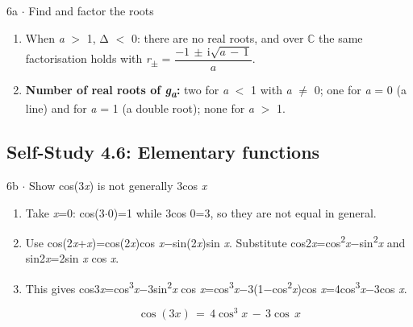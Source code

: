 \documentclass[11pt]{article}
\begin{document}
\begin{keepsection}
\begin{workedbox}{6a \ensuremath{\cdot} Find and factor the roots}
\begin{enumerate}
At \textit{a} = 1, Δ = 0 and \textit{g}\textsubscript{\textit{a}} = (\textit{x} + 1)\textsuperscript{2}, a double root at \ensuremath{-}1.
\item When \textit{a} \ensuremath{>} 1, Δ \ensuremath{<} 0: there are no real roots, and over \ensuremath{\mathbb{C}} the same factorisation holds with \textit{r}\textsubscript{\ensuremath{\pm}} = {\small\ensuremath{\dfrac{-1\, \pm \, \mathrm{i}\sqrt{{a}\, -\, 1}}{{a}}}}.
\item \textbf{Number of real roots of \textit{g}\textsubscript{\textit{a}}:} two for \textit{a} \ensuremath{<} 1 with \textit{a} \ensuremath{\neq} 0; one for \textit{a} = 0 (a line) and for \textit{a} = 1 (a double root); none for \textit{a} \ensuremath{>} 1.
\end{enumerate}
\end{workedbox}

\end{keepsection}
\begin{keepsection}\subsection{Self-Study 4.6: Elementary functions}

\begin{workedbox}{6b \ensuremath{\cdot} Show cos(3\textit{x}) is not generally 3cos \textit{x}}
\begin{enumerate}
\item Take \textit{x}=0: cos(3\ensuremath{\cdot}0)=1 while 3cos 0=3, so they are not equal in general.
\item Use cos(2\textit{x}+\textit{x})=cos(2\textit{x})cos \textit{x}\ensuremath{-}sin(2\textit{x})sin \textit{x}. Substitute cos2\textit{x}=cos\textsuperscript{2}\textit{x}\ensuremath{-}sin\textsuperscript{2}\textit{x} and sin2\textit{x}=2sin \textit{x} cos \textit{x}.
\item {}
This gives cos3\textit{x}=cos\textsuperscript{3}\textit{x}\ensuremath{-}3sin\textsuperscript{2}\textit{x} cos \textit{x}=cos\textsuperscript{3}\textit{x}\ensuremath{-}3(1\ensuremath{-}cos\textsuperscript{2}\textit{x})cos \textit{x}=4cos\textsuperscript{3}\textit{x}\ensuremath{-}3cos \textit{x}.

\begin{equation*}\cos (3{x})\, =\, 4\cos ^{3}{x}\, -\, 3\cos \, {x}\end{equation*}
\end{enumerate}
\end{workedbox}

\end{keepsection}
\end{document}
